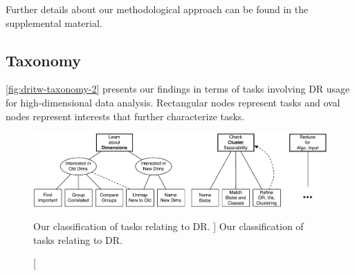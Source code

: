 Further details about our methodological approach can be found in the supplemental material.


\subsection{Taxonomy}
\label{app:drvistasks:dritw:taxonomy}


\autoref{fig:dritw-taxonomy-2} presents our findings in terms of tasks involving \ac{DR} usage for high-dimensional data analysis. 
Rectangular nodes represent tasks and oval nodes represent interests that further characterize tasks.


\begin{figure}
    \centering
    \includegraphics[width=\textwidth]{figures/dritw-taxonomy-2}
    \caption
    [
        Our classification of tasks relating to \ac{DR}.
    ]
    {
        Our classification of tasks relating to \ac{DR}.
    }
    \label{fig:dritw-taxonomy-2}
    \centering
\end{figure}




